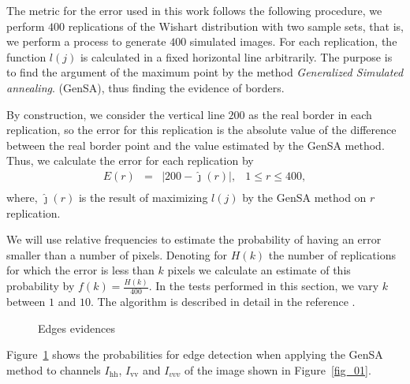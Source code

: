 \documentclass[conference]{IEEEtran}
\begin{document}
    The metric for the error used in this work follows the following procedure, we perform $400$ replications of the Wishart distribution with two sample sets, that is, we perform a process to generate $400$ simulated images. For each replication, the function $l(j)$ is calculated in a fixed horizontal line arbitrarily. The purpose is to find the argument of the maximum point by the method {\it Generalized Simulated annealing}. (GenSA), thus finding the evidence of borders.
    
     By construction, we consider the vertical line $200$ as the real border in each replication, so the error for this replication is the absolute value of the difference between the real border point and the value estimated by the GenSA method. Thus, we calculate the error for each replication by
\begin{equation}\label{eq_12}
\begin{array}{llll}
	E(r) &=& |200 - \hat{\jmath}(r)|, & 1\leq r \leq 400,  \\
\end{array}
\end{equation}
where, $\hat{\jmath}(r)$ is the result of maximizing $l(j)$ by the GenSA method on $r$ replication.

We will use relative frequencies to estimate the probability of having an error smaller than a number of pixels. Denoting for $H(k)$ the number of replications for which the error is less than $k$ pixels we calculate an estimate of this probability by $f(k)=\frac{H(k)}{400}$. In the tests performed in this section, we vary $k$ between $1$ and $10$. The algorithm is described in detail in the reference \cite{fbgm}. 
\begin{figure}[!ht]
     \centering
     \caption{Edges evidences}
     \label{fig_03}
   \end{figure}	
   
Figure~\ref{fig_03} shows the probabilities for edge detection when applying the GenSA method to channels $I_\text{hh}$, $I_\text{vv}$ and $I_{vvv}$ of the image shown in Figure~\ref{fig_01}. 
\end{document}
